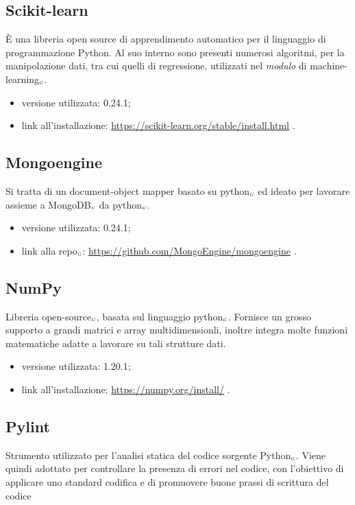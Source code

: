 \subsection{Scikit-learn}\label{LibrerieScikitLearn}
È una libreria open source di apprendimento automatico per il linguaggio di programmazione Python.
Al suo interno sono presenti numerosi algoritmi, per la manipolazione dati, tra cui quelli di regressione, utilizzati nel \textit{modulo} di machine-learning$_{\scaleto{G}{3pt}}$.

\begin{itemize}
  \item versione utilizzata: 0.24.1;
  \item link all'installazione: \url{https://scikit-learn.org/stable/install.html} .
\end{itemize}

\subsection{Mongoengine}\label{LibrerieMongoengine}
Si tratta di un document-object mapper basato su python$_{\scaleto{G}{3pt}}$ ed ideato per lavorare assieme a MongoDB$_{\scaleto{G}{3pt}}$ da python$_{\scaleto{G}{3pt}}$.

\begin{itemize}
  \item versione utilizzata: 0.24.1;
  \item link alla repo$_{\scaleto{G}{3pt}}$: \url{https://github.com/MongoEngine/mongoengine} .
\end{itemize}

\subsection{NumPy}\label{LibrerieNumpy}
Libreria open-source$_{\scaleto{G}{3pt}}$, basata sul linguaggio python$_{\scaleto{G}{3pt}}$.
Fornisce un grosso supporto a grandi matrici e array multidimensionli, inoltre integra molte funzioni matematiche adatte a lavorare su tali strutture dati.

\begin{itemize}
  \item versione utilizzata: 1.20.1;
  \item link all'installazione: \url{https://numpy.org/install/} .
\end{itemize}

\subsection{Pylint}\label{LibreriePylint}
Strumento utilizzato per l’analisi statica del codice sorgente Python$_{\scaleto{G}{3pt}}$. Viene quindi adottato per controllare la presenza di errori nel codice, con l’obiettivo di applicare uno standard codifica e di promuovere buone prassi di scrittura del codice

